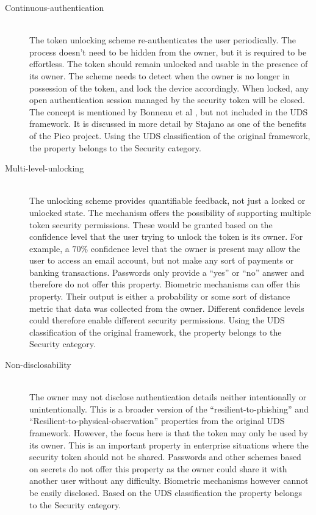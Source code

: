 \begin{description}
  \item[Continuous-authentication] \hfill \\
  The token unlocking scheme re-authenticates the user periodically. The process doesn't need to be hidden from the owner, but it is required to be effortless. The token should remain unlocked and usable in the presence of its owner. The scheme needs to detect when the owner is no longer in possession of the token, and lock the device accordingly. When locked, any open authentication session managed by the security token will be closed. The concept is mentioned by Bonneau et al \cite{bonneau2012quest}, but not included in the UDS framework. It is discussed in more detail by Stajano \cite{stajano2011pico} as one of the benefits of the Pico project. Using the UDS classification of the original framework, the property belongs to the Security category.
  
  \item[Multi-level-unlocking] \hfill \\
  The unlocking scheme provides quantifiable feedback, not just a locked or unlocked state. The mechanism offers the possibility of supporting multiple token security permissions. These would be granted based on the confidence level that the user trying to unlock the token is its owner. For example, a $70\%$ confidence level that the owner is present may allow the user to access an email account, but not make any sort of payments or banking transactions. Passwords only provide a ``yes'' or ``no'' answer and therefore do not offer this property. Biometric mechanisms can offer this property. Their output is either a probability or some sort of distance metric that data was collected from the owner. Different confidence levels could therefore enable different security permissions. Using the UDS classification of the original framework, the property belongs to the Security category. 
  
  \item[Non-disclosability] \hfill \\
  The owner may not disclose authentication details neither intentionally or unintentionally. This is a broader version of the ``resilient-to-phishing'' and ``Resilient-to-physical-observation'' properties from the original UDS framework. However, the focus here is that the token may only be used by its owner. This is an important property in enterprise situations where the security token should not be shared. Passwords and other schemes based on secrets do not offer this property as the owner could share it with another user without any difficulty. Biometric mechanisms however cannot be easily disclosed. Based on the UDS classification the property belongs to the Security category.
  

\end{description}
